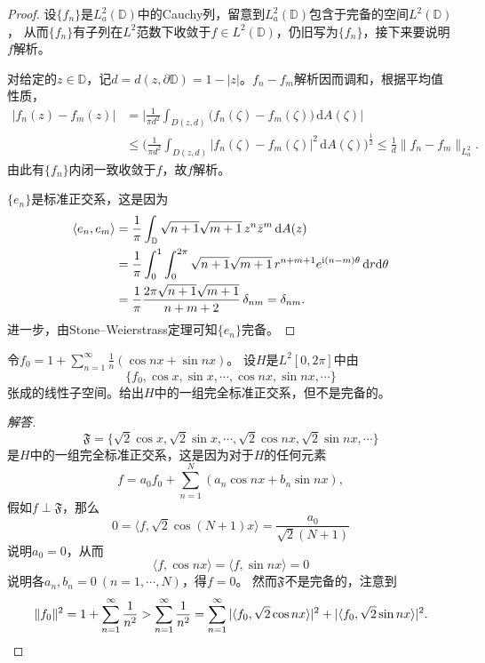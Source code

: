 \begin{proof}
    设$\{f_n\}$是$L_a^2(\mathbb{D})$中的Cauchy列，留意到$L_a^2(\mathbb{D})$包含于完备的空间$L^2(\mathbb{D})$，
    从而$\{f_n\}$有子列在$L^2$范数下收敛于$f \in L^2(\mathbb{D})$，仍旧写为$\{f_n\}$，接下来要说明$f$解析。

    对给定的$z\in\mathbb{D}$，记$d=d(z,\partial\mathbb{D})=1-|z|$。$f_n-f_m$解析因而调和，根据平均值性质，
    \begin{align*}|f_n(z)-f_m(z)|&=\bigg|\frac{1}{\pi d^2}\int_{D(z,d)} \big(f_n(\zeta)-f_m(\zeta)\big)\,\mathrm{d}A(\zeta)\bigg|\\
    &\leqslant\bigg(\frac{1}{\pi d^2}\int_{D(z,d)} |f_n(\zeta)-f_m(\zeta)|^2\,\mathrm{d}A(\zeta)\bigg)^\frac{1}{2}
    \leqslant\frac{1}{d}\|f_n-f_m\|_{L^2_a}.\end{align*}
    由此有$\{f_n\}$内闭一致收敛于$f$，故$f$解析。

    $\{e_n\}$是标准正交系，这是因为
    \begin{align}
        \langle e_n,e_m \rangle&=\frac{1}{\pi}\int_{\mathbb{D}}\sqrt{n+1}\sqrt{m+1}\,z^{n}\bar{z}^m\,{\rm d}A(z)\\
        &=\frac{1}{\pi}\int_0^1\int_0^{2\pi}\sqrt{n+1}\sqrt{m+1}\,r^{n+m+1}e^{{\rm i}(n-m)\theta}\,{\rm d}r{\rm d}\theta\\
        &=\frac{1}{\pi}\frac{2\pi\sqrt{n+1}\sqrt{m+1}}{n+m+2}\,\delta_{nm}=\delta_{nm}.
    \end{align}
    进一步，由Stone--Weierstrass定理可知$\{e_n\}$完备。
\end{proof}
\begin{10}
    令$\displaystyle f_0=1+\sum_{n=1}^\infty\frac{1}{n}(\cos nx+\sin nx)$。
    设$H$是$L^2[0,2\pi]$中由
    $$\{f_0,\cos x,\sin x,\cdots,\cos nx,\sin nx,\cdots\}$$
    张成的线性子空间。给出$H$中的一组完全标准正交系，但不是完备的。
\end{10}
\begin{proof}[解答]
$$\mathfrak{F}=\{\sqrt{2}\cos x,\sqrt{2}\sin x,\cdots,\sqrt{2}\cos nx,\sqrt{2}\sin nx,\cdots\}$$
是$H$中的一组完全标准正交系，这是因为对于$H$的任何元素
$$f=a_0f_0+\sum_{n=1}^N(a_n\cos nx+b_n\sin nx),$$
假如$f\perp\mathfrak{F}$，那么
$$0=\langle f,\sqrt{2}\cos(N+1)x\rangle=\frac{a_0}{\sqrt{2}(N+1)}$$
说明$a_0=0$，从而
\[\langle f,\cos nx \rangle=\langle f,\sin nx \rangle=0\]
说明各$a_n,b_n=0\ (n=1,\cdots,N)$，得$f=0$。
然而$\mathfrak{F}$不是完备的，注意到
$$\|f_0\|^2=1+\sum_{n=1}^\infty\frac{1}{n^2}>\sum_{n=1}^\infty\frac{1}{n^2}
=\sum_{n=1}^\infty|\langle f_0,\sqrt{2}\cos nx\rangle|^2
+|\langle f_0,\sqrt{2}\sin nx\rangle|^2.\qedhere$$
\end{proof}

